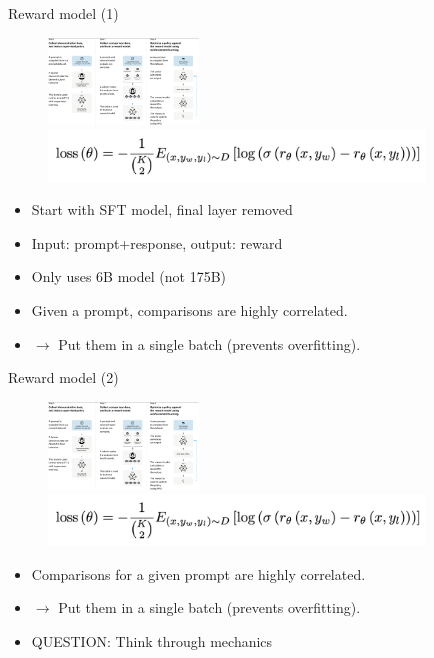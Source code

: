 \begin{vbframe}{Reward model (1)}


\begin{figure}
\centering
\includegraphics[width = 4cm]{figure/threesteps.png}\\
\includegraphics[width = 10cm]{figure/rewardloss.png}
\end{figure}


\begin{itemize}
	\item Start with SFT model, final layer removed
        	\item Input: prompt+response, output: reward
        \item Only uses 6B model (not 175B)
        \item Given a prompt, comparisons  
      are
        	highly correlated.
                \item $\rightarrow$ Put them in
        	a single batch (prevents overfitting).
\end{itemize}

\vfill

\end{vbframe}

\begin{vbframe}{Reward model (2)}


\begin{figure}
\centering
\includegraphics[width = 4cm]{figure/threesteps.png}\\
\includegraphics[width = 10cm]{figure/rewardloss.png}
\end{figure}


\begin{itemize}
        \item Comparisons  for a
        	given prompt are
        	highly correlated.
                \item $\rightarrow$ Put them in
        	a single batch (prevents overfitting).
\item QUESTION: Think through mechanics
\end{itemize}

\vfill

\end{vbframe}


